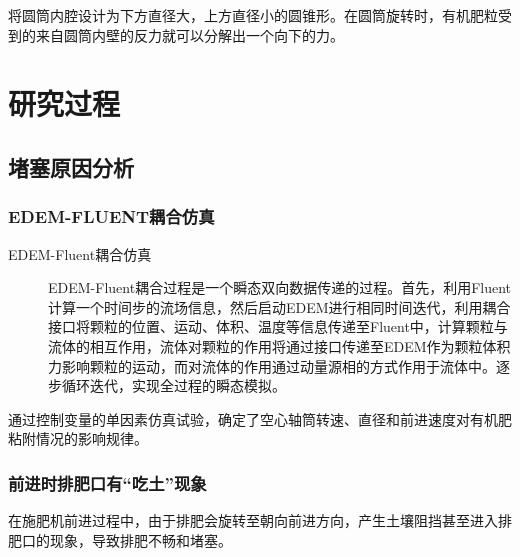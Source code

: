 \documentclass{article}
\begin{document}
将圆筒内腔设计为下方直径大，上方直径小的圆锥形。在圆筒旋转时，有机肥粒受到的来自圆筒内壁的反力就可以分解出一个向下的力。

\section{研究过程}

\subsection{堵塞原因分析}

\subsubsection{EDEM-FLUENT耦合仿真}

\begin{description}
	\item[EDEM-Fluent耦合仿真]
	
	EDEM-Fluent耦合过程是一个瞬态双向数据传递的过程。首先，利用Fluent计算一个时间步的流场信息，然后启动EDEM进行相同时间迭代，利用耦合接口将颗粒的位置、运动、体积、温度等信息传递至Fluent中，计算颗粒与流体的相互作用，流体对颗粒的作用将通过接口传递至EDEM作为颗粒体积力影响颗粒的运动，而对流体的作用通过动量源相的方式作用于流体中。逐步循环迭代，实现全过程的瞬态模拟。
\end{description}

通过控制变量的单因素仿真试验，确定了空心轴筒转速、直径和前进速度对有机肥粘附情况的影响规律。

\subsubsection{前进时排肥口有“吃土”现象}

在施肥机前进过程中，由于排肥会旋转至朝向前进方向，产生土壤阻挡甚至进入排肥口的现象，导致排肥不畅和堵塞。
\end{document}
